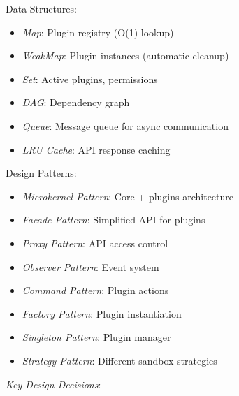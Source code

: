 \documentclass[11pt]{article}
\begin{document}
Data Structures:

\begin{itemize}
\item \emph{Map}: Plugin registry (O(1) lookup)
\item \emph{WeakMap}: Plugin instances (automatic cleanup)
\item \emph{Set}: Active plugins, permissions
\item \emph{DAG}: Dependency graph
\item \emph{Queue}: Message queue for async communication
\item \emph{LRU Cache}: API response caching
\end{itemize}

Design Patterns:

\begin{itemize}
\item \emph{Microkernel Pattern}: Core + plugins architecture
\item \emph{Facade Pattern}: Simplified API for plugins
\item \emph{Proxy Pattern}: API access control
\item \emph{Observer Pattern}: Event system
\item \emph{Command Pattern}: Plugin actions
\item \emph{Factory Pattern}: Plugin instantiation
\item \emph{Singleton Pattern}: Plugin manager
\item \emph{Strategy Pattern}: Different sandbox strategies
\end{itemize}

\emph{Key Design Decisions}:
\end{document}
